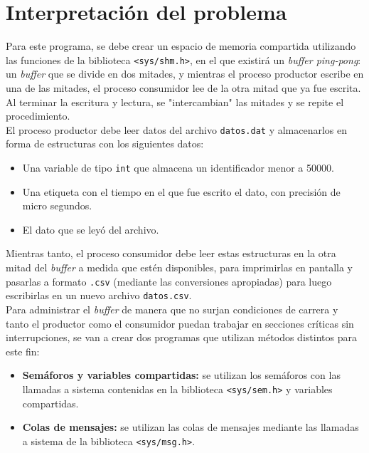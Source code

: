 \section{Interpretación del problema}
Para este programa, se debe crear un espacio de memoria compartida utilizando las funciones de la biblioteca \texttt{<sys/shm.h>}, en el que existirá un \textit{buffer ping-pong}: un \textit{buffer} que se divide en dos mitades, y mientras el proceso productor escribe en una de las mitades, el proceso consumidor lee de la otra mitad que ya fue escrita. Al terminar la escritura y lectura, se "intercambian" las mitades y se repite el procedimiento.\\

El proceso productor debe leer datos del archivo \texttt{datos.dat} y almacenarlos en forma de estructuras con los siguientes datos:\\

\begin{itemize}
    \item Una variable de tipo \texttt{int} que almacena un identificador menor a 50000.
    \item Una etiqueta con el tiempo en el que fue escrito el dato, con precisión de micro segundos.
    \item El dato que se leyó del archivo.\\
\end{itemize}

Mientras tanto, el proceso consumidor debe leer estas estructuras en la otra mitad del \textit{buffer} a medida que estén disponibles, para imprimirlas en pantalla y pasarlas a formato \texttt{.csv} (mediante las conversiones apropiadas) para luego escribirlas en un nuevo archivo \texttt{datos.csv}.\\

Para administrar el \textit{buffer} de manera que no surjan condiciones de carrera y tanto el productor como el consumidor puedan trabajar en secciones críticas sin interrupciones, se van a crear dos programas que utilizan métodos distintos para este fin:\\

\begin{itemize}
    \item \textbf{Semáforos y variables compartidas:} se utilizan los semáforos con las llamadas a sistema contenidas en la biblioteca \texttt{<sys/sem.h>} y variables compartidas.
    \item \textbf{Colas de mensajes:} se utilizan las colas de mensajes mediante las llamadas a sistema de la biblioteca \texttt{<sys/msg.h>}.\\
\end{itemize}